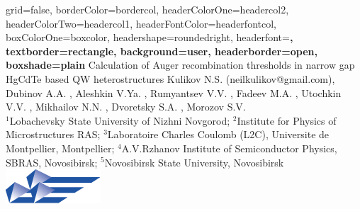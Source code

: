 \documentclass[a0paper,portrait]{baposter}
\begin{document}

\begin{poster}{
    grid=false,
    borderColor=bordercol, %
    headerColorOne=headercol2, %
    headerColorTwo=headercol1, %
    headerFontColor=headerfontcol, %
    boxColorOne=boxcolor, %
    headershape=roundedright, %
    headerfont=\sf\bf, %
    textborder=rectangle,
    background=user,
    headerborder=open, %
    boxshade=plain
    }{}
    {Calculation of Auger recombination thresholds in narrow gap HgCdTe based QW heterostructures} %
    {\scriptsize{Kulikov N.S. \footnotemark[1] (neilkulikov@gmail.com), Dubinov A.A. \footnotemark[2], 
    Aleshkin V.Ya. \footnotemark[2], Rumyantsev V.V. \footnotemark[1] \footnotemark[2], 
    Fadeev M.A. \footnotemark[2] \footnotemark[3], Utochkin V.V. \footnotemark[1] \footnotemark[2], 
    Mikhailov N.N. \footnotemark[4] \footnotemark[5], Dvoretsky S.A. \footnotemark[4],
    Morozov S.V. \footnotemark[2]}  \\ %
        \tiny{${}^1${Lobachevsky State University of Nizhni Novgorod}; 
        ${}^2${Institute for Physics of Microstructures RAS};
        ${}^3${Laboratoire Charles Coulomb (L2C), Universite de Montpellier, Montpellier};
        ${}^4${A.V.Rzhanov Institute of Semiconductor Physics, SBRAS, Novosibirsk};
        ${}^5${Novosibirsk State University, Novosibirsk}}
    } %
    {\includegraphics[scale=0.75]{logo.png}}



\end{poster}
\end{document}
